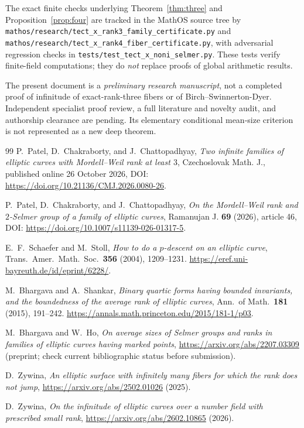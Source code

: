 \documentclass[11pt]{article}
\begin{document}
The exact finite checks underlying
Theorem~\ref{thm:three} and Proposition~\ref{prop:four}
are tracked in the MathOS source tree by
\texttt{mathos/research/tect\_x\_rank3\_family\_certificate.py}
and
\texttt{mathos/research/tect\_x\_rank4\_fiber\_certificate.py},
with adversarial regression checks in
\texttt{tests/test\_tect\_x\_noni\_selmer.py}.
These tests verify finite-field computations; they do
\emph{not} replace proofs of global arithmetic results.

The present document is a \emph{preliminary research
manuscript}, not a completed proof of infinitude
of exact-rank-three fibers or of Birch--Swinnerton-Dyer.
Independent specialist proof review, a full literature
and novelty audit, and authorship clearance are
pending. Its elementary conditional mean-size
criterion is not represented as a new deep theorem.

\begin{thebibliography}{99}
P.~Patel, D.~Chakraborty, and J.~Chattopadhyay,
\emph{Two infinite families of elliptic curves with Mordell--Weil rank
at least $3$}, Czechoslovak Math. J., published online
26 October 2026, DOI: \url{https://doi.org/10.21136/CMJ.2026.0080-26}.

P.~Patel, D.~Chakraborty, and J.~Chattopadhyay,
\emph{On the Mordell--Weil rank and $2$-Selmer group of a family of
elliptic curves}, Ramanujan J. \textbf{69} (2026), article 46,
DOI: \url{https://doi.org/10.1007/s11139-026-01317-5}.

E.~F.~Schaefer and M.~Stoll, \emph{How to do a $p$-descent on an elliptic curve},
Trans.\ Amer.\ Math.\ Soc.\ \textbf{356} (2004), 1209--1231.
\url{https://eref.uni-bayreuth.de/id/eprint/6228/}.

M.~Bhargava and A.~Shankar,
\emph{Binary quartic forms having bounded invariants, and the
boundedness of the average rank of elliptic curves},
Ann.\ of Math.\ \textbf{181} (2015), 191--242.
\url{https://annals.math.princeton.edu/2015/181-1/p03}.

M.~Bhargava and W.~Ho,
\emph{On average sizes of Selmer groups and ranks in
families of elliptic curves having marked points},
\url{https://arxiv.org/abs/2207.03309}
(preprint; check current bibliographic status before submission).

D.~Zywina,
\emph{An elliptic surface with infinitely many fibers
for which the rank does not jump},
\url{https://arxiv.org/abs/2502.01026} (2025).

D.~Zywina, \emph{On the infinitude of elliptic curves
over a number field with prescribed small rank},
\url{https://arxiv.org/abs/2602.10865} (2026).
\end{thebibliography}
\end{document}
